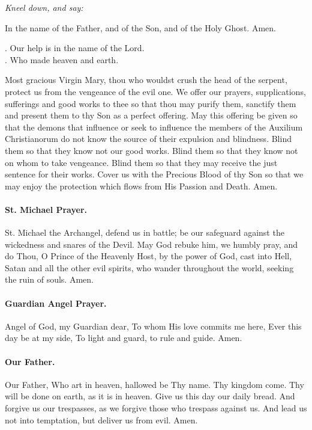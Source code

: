 \documentclass{article}
\makeatletter
\DeclareRobustCommand{\versicle}{\textbf{\vers@resp{-0.1em}{V}}}
\DeclareRobustCommand{\response}{\textbf{\vers@resp{0pt}{R}}}
\newcommand{\vers@resp@sym}{\raisebox{0.2ex}{\rotatebox[origin=c]{-20}{$\m@th\rceil$}}}
\newcommand{\vers@resp}[2]{%
  {\ooalign{\hidewidth\kern#1\vers@resp@sym\hidewidth\cr#2\cr}}%
}
\makeatother
\begin{document}
\pagebreak
{}

\begin{multicols}{3}

\textit{Kneel down, and say:}

In the name of the Father, and of the Son, and of the Holy Ghost.  Amen.

\versicle. Our help is in the name of the Lord.\\
\response. Who made heaven and earth.

Most gracious Virgin Mary, thou who wouldst crush the head of the
serpent, protect us from the vengeance of the evil one. We offer our prayers,
supplications, sufferings and good works to thee so that thou may purify them,
sanctify them and present them to thy Son as a perfect offering. May this offering
be given so that the demons that influence or seek to influence the members of the
Auxilium Christianorum do not know the source of their expulsion and blindness.
Blind them so that they know not our good works. Blind them so that they know
not on whom to take vengeance. Blind them so that they may receive the just
sentence for their works. Cover us with the Precious Blood of thy Son so that we
may enjoy the protection which flows from His Passion and Death. Amen.

\paragraph*{St. Michael Prayer.}  St. Michael the Archangel, defend us in battle; be our safeguard against the wickedness and snares of the Devil. May God rebuke him, we humbly pray, and do Thou, O Prince of the Heavenly Host, by the power of God, cast into Hell, Satan and all the other evil spirits, who wander throughout the world, seeking the ruin of souls. Amen.

\paragraph*{Guardian Angel Prayer.}  Angel of God, my Guardian dear, To whom His love commits me here, Ever this day be at my side, To light and guard, to rule and guide.  Amen.

\paragraph{Our Father.}  Our Father, Who art in heaven, hallowed be Thy name.
Thy kingdom come.  Thy will be done on earth, as it is in heaven.
Give us this day our daily bread.  And forgive us our trespasses,
as we forgive those who trespass against us.  And lead us not
into temptation, but deliver us from evil.  Amen.


\end{multicols}
\end{document}
